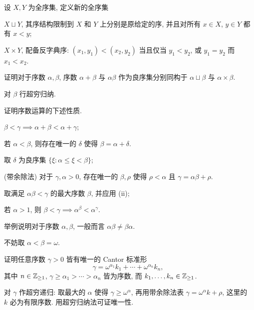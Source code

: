 \begin{Exercises}
	\item 设 $X, Y$ 为全序集, 定义新的全序集
		\begin{compactenum}[(i)]
			\item $X \sqcup Y$, 其序结构限制到 $X$ 和 $Y$ 上分别是原给定的序, 并且对所有 $x \in X$, $y \in Y$ 都有 $x < y$;
			\item $X \times Y$, 配备反字典序: $(x_1, y_1) < (x_2, y_2)$ 当且仅当 $y_1 < y_2$, 或 $y_1=y_2$ 而 $x_1 < x_2$.
		\end{compactenum}
		证明对于序数 $\alpha, \beta$, 序数 $\alpha + \beta$ 与 $\alpha \beta$ 作为良序集分别同构于 $\alpha \sqcup \beta$ 与 $\alpha \times \beta$.
		\begin{hint} 对 $\beta$ 行超穷归纳. \end{hint}
	\item 证明序数运算的下述性质.
		\begin{compactenum}[(i)]
			\item $\beta < \gamma \implies \alpha + \beta < \alpha + \gamma$;
			\item 若 $\alpha < \beta$, 则存在唯一的 $\delta$ 使得 $\beta = \alpha + \delta$. \begin{hint} 取 $\delta$ 为良序集 $\{\xi : \alpha \leq \xi < \beta \}$;\end{hint}
			\item (带余除法) 对于 $\gamma, \alpha > 0$, 存在唯一的 $\beta, \rho$ 使得 $\rho < \alpha$ 且 $\gamma = \alpha \beta + \rho$. \begin{hint}取满足 $\alpha\beta < \gamma$ 的最大序数 $\beta$, 并应用 (ii); \end{hint}
			\item 若 $\alpha > 1$, 则 $\beta < \gamma \implies \alpha^\beta < \alpha^\gamma$.
		\end{compactenum}
	\item 举例说明对于序数 $\alpha, \beta$, 一般而言 $\alpha \beta \neq \beta \alpha$. \begin{hint}不妨取 $\alpha < \beta = \omega$.\end{hint}
	\item 证明任意序数 $\gamma > 0$ 皆有唯一的 Cantor 标准形
		\[ \gamma= \omega^{\alpha_1} k_1 + \cdots + \omega^{\alpha_n} k_n, \]
		其中 $n \in \mathbb{Z}_{\geq 1}$, $\gamma \geq \alpha_1 > \cdots > \alpha_n$ 皆为序数, 而 $k_1, \ldots, k_n \in \mathbb{Z}_{\geq 1}$. \begin{hint}对 $\gamma$ 作超穷递归: 取最大的 $\alpha$ 使得 $\gamma \geq \omega^\alpha $, 再用带余除法表 $\gamma = \omega^\alpha k + \rho$, 这里的 $k$ 必为有限序数. 用超穷归纳法可证唯一性.\end{hint}

\end{Exercises}
